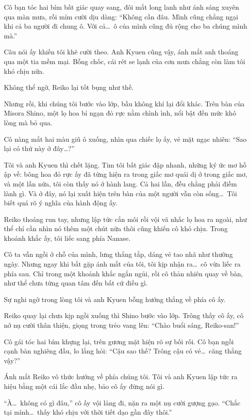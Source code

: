 \documentclass[../main.tex]{subfiles}
\begin{document}
Cô bạn tóc hai bím bất giác quay sang, đôi mắt long lanh như ánh sáng xuyên qua màn mưa, rồi mỉm cười dịu dàng: ``Không cần đâu. Mình cũng chẳng ngại khi cả ba người đi chung ô. Với cả\dots\ ô của mình cũng đủ rộng cho ba chúng mình mà.''

Câu nói ấy khiến tôi khẽ cười theo. Anh Kyuen cũng vậy, ánh mắt anh thoáng qua một tia mềm mại. Bỗng chốc, cái rét se lạnh của cơn mưa chẳng còn làm tôi khó chịu nữa.

Không thể ngờ, Reiko lại tốt bụng như thế.

Nhưng rồi, khi chúng tôi bước vào lớp, bầu không khí lại đổi khác. Trên bàn của Misora Shino, một lọ hoa bỉ ngạn đỏ rực nằm chình ình, nổi bật đến mức khó lòng mà bỏ qua.

Cô nàng mắt hai màu giũ ô xuống, nhìn qua chiếc lọ ấy, vẻ mặt ngạc nhiên: ``Sao lại có thứ này ở đây\dots?''

Tôi và anh Kyuen thì chết lặng. Tim tôi bất giác đập nhanh, những ký ức mơ hồ ập về: bông hoa đỏ rực ấy đã từng hiện ra trong giấc mơ quái dị ở trong giấc mơ, và một lần nữa, tôi còn thấy nó ở hành lang. Cả hai lần, đều chẳng phải điềm lành gì. Và ở đây, nó lại xuất hiện trên bàn của một người vẫn còn sống\dots\ Tôi biết quá rõ ý nghĩa của hành động ấy.

Reiko thoáng run tay, nhưng lập tức cắn môi rồi vội vã nhấc lọ hoa ra ngoài, như thể chỉ cần nhìn nó thêm một chút nữa thôi cũng khiến cô khó chịu. Trong khoảnh khắc ấy, tôi liếc sang phía Nanase.

Cô ta vẫn ngồi ở chỗ của mình, lưng thẳng tắp, dáng vẻ tao nhã như thường ngày. Nhưng ngay khi bắt gặp ánh mắt của tôi, tôi kịp nhận ra\dots\ cô vừa liếc ra phía sau. Chỉ trong một khoảnh khắc ngắn ngủi, rồi cô thản nhiên quay về bàn, như thể chưa từng quan tâm đến bất cứ điều gì.

Sự nghi ngờ trong lòng tôi và anh Kyuen bỗng hướng thẳng về phía cô ấy.

Reiko quay lại chưa kịp ngồi xuống thì Shino bước vào lớp. Trông thấy cô ấy, cô nở nụ cười thân thiện, giọng trong trẻo vang lên: ``Chào buổi sáng, Reiko-san!''

Cô gái tóc hai bím khựng lại, trên gương mặt hiện rõ sự bối rối. Cô bạn ngồi cạnh bàn nghiêng đầu, lo lắng hỏi: ``Cậu sao thế? Trông cậu có vẻ\dots\ căng thẳng vậy?''

Ánh mắt Reiko vô thức hướng về phía chúng tôi. Tôi và anh Kyuen lập tức ra hiệu bằng một cái lắc đầu nhẹ, bảo cô ấy đừng nói gì.

``À\dots\ không có gì đâu,'' cô ấy vội lảng đi, nặn ra một nụ cười gượng gạo. ``Chắc tại mình\dots\ thấy khó chịu với thời tiết dạo gần đây thôi.''
\end{document}
